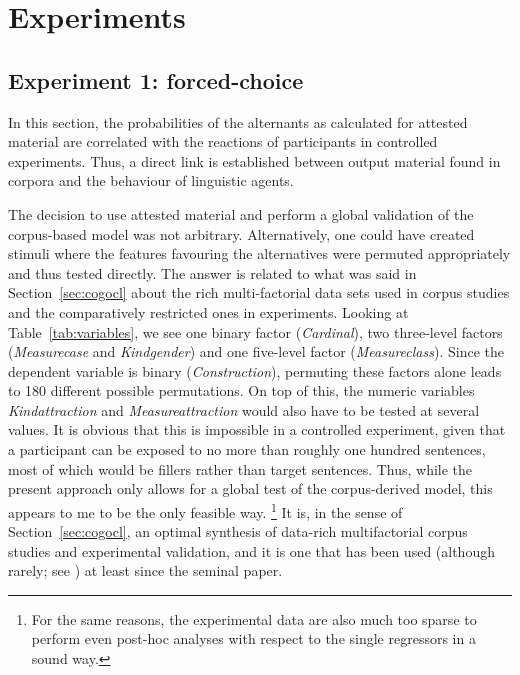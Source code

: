 \section{Experiments}
\label{sec:experimental}

\subsection{Experiment 1: forced-choice}
\label{sec:exp:fc}

In this section, the probabilities of the alternants as calculated for attested material are correlated with the reactions of participants in controlled experiments.
Thus, a direct link is established between output material found in corpora and the behaviour of linguistic agents.

The decision to use attested material and perform a global validation of the corpus-based model was not arbitrary.
Alternatively, one could have created stimuli where the features favouring the alternatives were permuted appropriately and thus tested directly.
The answer is related to what was said in Section~\ref{sec:cogocl} about the rich multi-factorial data sets used in corpus studies and the comparatively restricted ones in experiments.
Looking at Table~\ref{tab:variables}, we see one binary factor (\textit{Cardinal}), two three-level factors (\textit{Measurecase} and \textit{Kindgender}) and one five-level factor (\textit{Measureclass}).
Since the dependent variable is binary (\textit{Construction}), permuting these factors alone leads to 180 different possible permutations.
On top of this, the numeric variables \textit{Kindattraction} and \textit{Measureattraction} would also have to be tested at several values.
It is obvious that this is impossible in a controlled experiment, given that a participant can be exposed to no more than roughly one hundred sentences, most of which would be fillers rather than target sentences.
Thus, while the present approach only allows for a global test of the corpus-derived model, this appears to me to be the only feasible way.%
\footnote{For the same reasons, the experimental data are also much too sparse to perform even post-hoc analyses with respect to the single regressors in a sound way.}
It is, in the sense of Section~\ref{sec:cogocl}, an optimal synthesis of data-rich multifactorial corpus studies and experimental validation, and it is one that has been used (although rarely; see \citealp[3--4]{DivjakEa2016a}) at least since the seminal \citet{BresnanEa2007} paper.

